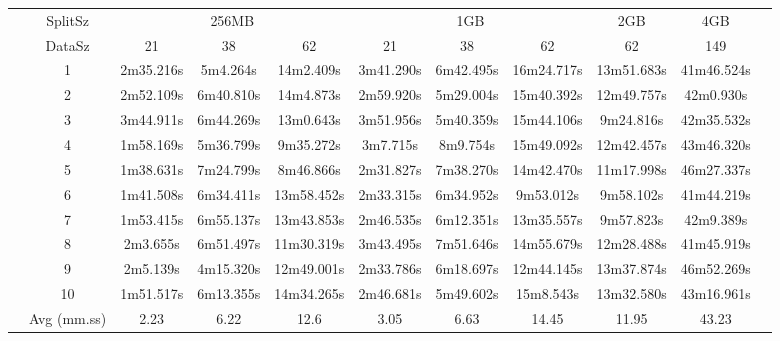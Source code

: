 \begin{tabularx}{\linewidth}{c|c|c|c|c|c|c|c|c|c|l|}
\cline{2-10}
& SplitSz 
& \multicolumn{3}{c|}{256MB} & \multicolumn{3}{c|}{1GB}  & \multicolumn{1}{c|}{2GB} & \multicolumn{1}{c|}{4GB} \\
\cline{2-10}
& DataSz 
& 21 & 38 & 62 & 21 & 38 & 62 & 62 & 149 \\
\cline{2-10}
& 1
& 2m35.216s & 5m4.264s & 14m2.409s & 3m41.290s & 6m42.495s & 16m24.717s & 13m51.683s & 41m46.524s \\
\cline{2-10}
& 2
& 2m52.109s & 6m40.810s & 14m4.873s & 2m59.920s & 5m29.004s & 15m40.392s & 12m49.757s & 42m0.930s \\
\cline{2-10}
& 3
& 3m44.911s & 6m44.269s & 13m0.643s & 3m51.956s & 5m40.359s & 15m44.106s & 9m24.816s & 42m35.532s \\
\cline{2-10}
& 4
& 1m58.169s & 5m36.799s & 9m35.272s & 3m7.715s & 8m9.754s & 15m49.092s & 12m42.457s & 43m46.320s \\
\cline{2-10}
& 5
& 1m38.631s & 7m24.799s & 8m46.866s & 2m31.827s & 7m38.270s & 14m42.470s & 11m17.998s & 46m27.337s \\
\cline{2-10}
& 6
& 1m41.508s & 6m34.411s & 13m58.452s & 2m33.315s & 6m34.952s & 9m53.012s & 9m58.102s & 41m44.219s \\
\cline{2-10}
& 7
& 1m53.415s & 6m55.137s & 13m43.853s & 2m46.535s & 6m12.351s & 13m35.557s & 9m57.823s & 42m9.389s \\
\cline{2-10}
& 8
& 2m3.655s & 6m51.497s & 11m30.319s & 3m43.495s & 7m51.646s & 14m55.679s & 12m28.488s & 41m45.919s \\
\cline{2-10}
& 9
& 2m5.139s & 4m15.320s & 12m49.001s & 2m33.786s & 6m18.697s & 12m44.145s & 13m37.874s & 46m52.269s \\
\cline{2-10}
& 10
& 1m51.517s & 6m13.355s & 14m34.265s & 2m46.681s & 5m49.602s & 15m8.543s & 13m32.580s & 43m16.961s \\
\cline{2-10}
& Avg (mm.ss)
& 2.23 & 6.22 & 12.6 & 3.05 & 6.63 & 14.45 & 11.95 & 43.23 \\
\cline{2-10}
\end{tabularx}
